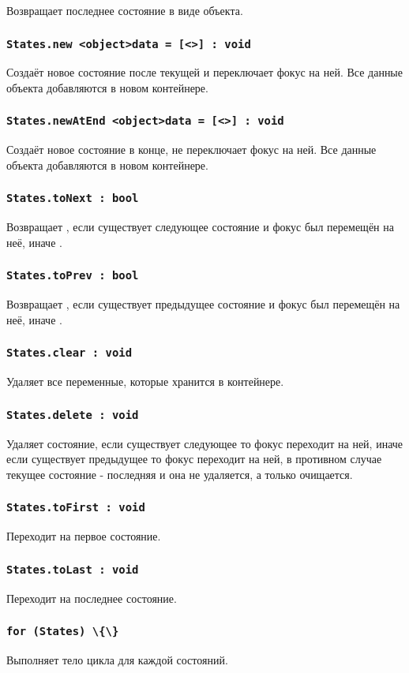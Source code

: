 Возвращает последнее состояние в виде объекта.

\subsubsection{\lstinline|States.new <object>data = [<>] : void|}

Создаёт новое состояние после текущей и переключает фокус на ней. Все данные объекта  добавляются в новом контейнере.

\subsubsection{\lstinline|States.newAtEnd <object>data = [<>] : void|}

Создаёт новое состояние в конце, не переключает фокус на ней. Все данные объекта  добавляются в новом контейнере.

\subsubsection{\lstinline|States.toNext : bool|}

Возвращает \true, если существует следующее состояние и фокус был перемещён на неё, иначе \false.

\subsubsection{\lstinline|States.toPrev : bool|}

Возвращает \true, если существует предыдущее состояние и фокус был перемещён на неё, иначе \false.

\subsubsection{\lstinline|States.clear : void|}

Удаляет все переменные, которые хранится в контейнере.

\subsubsection{\lstinline|States.delete : void|}

Удаляет состояние, если существует следующее то фокус переходит на ней, иначе если существует предыдущее то фокус переходит на ней, в противном случае текущее состояние - последняя и она не удаляется, а только очищается.

\subsubsection{\lstinline|States.toFirst : void|}

Переходит на первое состояние.

\subsubsection{\lstinline|States.toLast : void|}

Переходит на последнее состояние.

\subsubsection{\lstinline|for (States) \{\}|}

Выполняет тело цикла для каждой состояний.

